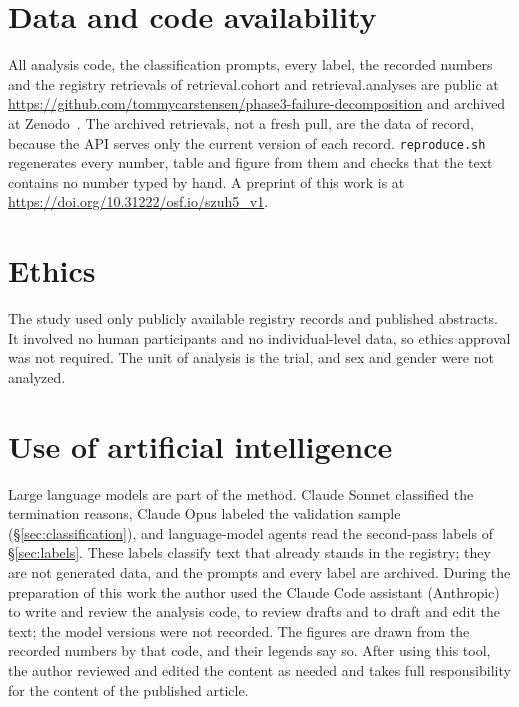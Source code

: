 \documentclass[preprint,11pt]{elsarticle}
\newcommand{\code}[1]{\texttt{\small #1}}
\begin{document}
\section*{Data and code availability}
All analysis code, the classification prompts, every label, the recorded numbers and the registry retrievals of \num{retrieval.cohort} and \num{retrieval.analyses} are public at \url{https://github.com/tommycarstensen/phase3-failure-decomposition} and archived at Zenodo~\cite{zenodo2026}. The archived retrievals, not a fresh pull, are the data of record, because the API serves only the current version of each record. \code{reproduce.sh} regenerates every number, table and figure from them and checks that the text contains no number typed by hand. A preprint of this work is at \url{https://doi.org/10.31222/osf.io/szuh5_v1}.

\section*{Ethics}
The study used only publicly available registry records and published abstracts. It involved no human participants and no individual-level data, so ethics approval was not required. The unit of analysis is the trial, and sex and gender were not analyzed.

\section*{Use of artificial intelligence}
Large language models are part of the method. Claude Sonnet classified the termination reasons, Claude Opus labeled the validation sample (\S\ref{sec:classification}), and language-model agents read the second-pass labels of \S\ref{sec:labels}. These labels classify text that already stands in the registry; they are not generated data, and the prompts and every label are archived. During the preparation of this work the author used the Claude Code assistant (Anthropic) to write and review the analysis code, to review drafts and to draft and edit the text; the model versions were not recorded. The figures are drawn from the recorded numbers by that code, and their legends say so. After using this tool, the author reviewed and edited the content as needed and takes full responsibility for the content of the published article.
\end{document}
